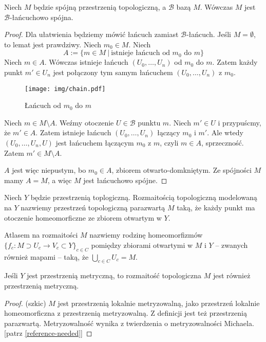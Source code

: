 \begin{lem} \label{lem:chain-connected}
  Niech $M$ będzie spójną przestrzenią topologiczną, a $\mathcal B$ bazą $M$. Wówczas $M$ jest $\mathcal B$-łańcuchowo spójna.
  \begin{proof}
    Dla ułatwienia będziemy mówić łańcuch zamiast $\mathcal B$-łańcuch.
    Jeśli $M = \emptyset$, to lemat jest prawdziwy. Niech $m_0 \in M$. Niech
    \[
      A := \{m \in M\ |\ \mbox{istnieje łańcuch od $m_0$ do $m$}\}
    \]
    Niech $m \in A$.
    Wówczas istnieje łańcuch $(U_0, \ldots, U_n)$ od $m_0$ do $m$.
    Zatem każdy punkt $m' \in U_n$ jest połączony tym samym łańcuchem $(U_0, \ldots, U_n)$ z $m_0$.
    
    \begin{figure}[h!]
      \centering
      \texttt{[image: img/chain.pdf]}
      \caption{Łańcuch od $m_0$ do $m$}
    \end{figure}
    
    Niech $m \in M\setminus A$.
    Weźmy otoczenie $U\in\mathcal B$ punktu $m$. Niech $m'\in U$ i przypuścmy, że $m'\in A$. Zatem istnieje łańcuch $(U_0, \ldots, U_n)$ łączący $m_0$ i $m'$. Ale wtedy $(U_0, \ldots, U_n, U)$ jest łańcuchem łączącym $m_0$ z $m$, czyli $m\in A$, sprzeczność. Zatem $m'\in M\setminus A$.
    
    $A$ jest więc niepustym, bo $m_0 \in A$, zbiorem otwarto-domkniętym. Ze spójności $M$ mamy $A = M$, a więc $M$ jest łańcuchowo spójne.
  \end{proof}
\end{lem}

\begin{df}
  Niech $Y$ będzie przestrzenią toplogiczną. Rozmaitością topologiczną modelowaną na $Y$ nazwiemy przestrzeń topologiczną parazwartą $M$ taką, że każdy punkt ma otoczenie homeomorficzne ze zbiorem otwartym w $Y$.
\end{df}

\begin{df}
  Atlasem na rozmaitości $M$ nazwiemy rodzinę homeomorfizmów $\{f_c : M \supset U_c \to V_c \subset Y\}_{c \in C}$ pomiędzy zbiorami otwartymi w $M$ i $Y$ -- zwanych również mapami -- taką, że $\bigcup_{c \in C} U_c = M$.
\end{df}


\begin{fact} \label{fact:local-metrizability}
  Jeśli $Y$ jest przestrzenią metryczną, to rozmaitość topologiczna $M$ jest również przestrzenią metryczną.
  \begin{proof}(szkic)
    $M$ jest przestrzenią lokalnie metryzowalną, jako przestrzeń lokalnie homeomorficzna z przestrzenią metryzowalną. Z definicji jest też przestrzenią parazwartą. Metryzowalność wynika z twierdzenia o metryzowalności Michaela. [patrz \ref{reference-needed}]
  \end{proof}
\end{fact}

